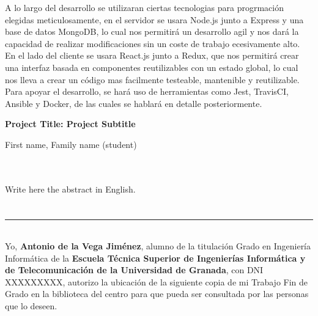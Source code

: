 A lo largo del desarrollo se utilizaran ciertas tecnologias para progrmación elegidas meticulosamente, en el servidor se usara Node.js junto a Express y una base de datos MongoDB, lo cual nos permitirá un desarrollo agil y nos dará la capacidad de realizar modificaciones sin un coste de trabajo ecesivamente alto. En el lado del cliente se usara React.js junto a Redux, que nos permitirá crear una interfaz basada en componentes reutilizables con un estado global, lo cual nos lleva a crear un código mas facilmente testeable, mantenible y reutilizable. Para apoyar el desarrollo, se hará uso de herramientas como Jest, TravisCI, Ansible y Docker, de las cuales se hablará en detalle posteriormente.

\cleardoublepage


\thispagestyle{empty}


\begin{center}
{\large\bfseries Project Title: Project Subtitle}\\
\end{center}
\begin{center}
First name, Family name (student)\\
\end{center}

\\

\vspace{0.7cm}
\\

Write here the abstract in English.

\chapter*{}
\thispagestyle{empty}

\noindent\rule[-1ex]{\textwidth}{2pt}\\[4.5ex]

Yo, \textbf{Antonio de la Vega Jiménez}, alumno de la titulación Grado en Ingeniería Informática de la \textbf{Escuela Técnica Superior
de Ingenierías Informática y de Telecomunicación de la Universidad de Granada}, con DNI XXXXXXXXX, autorizo la
ubicación de la siguiente copia de mi Trabajo Fin de Grado en la biblioteca del centro para que pueda ser
consultada por las personas que lo deseen.

\vspace{6cm}

